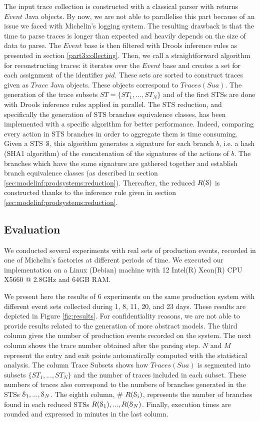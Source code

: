 The input trace collection is constructed with a classical parser
with returns $Event$ Java objects. By now, we are not able to
parallelise this part because of an issue we faced with
Michelin's logging system. The resulting drawback is that the
time to parse traces is longer than expected and heavily depends
on the size of data to parse. The $Event$ base is then filtered
with Drools inference rules as presented in section
\ref{part3:collecting}.  Then, we call a straightforward
algorithm for reconstructing traces: it iterates over the $Event$
base and creates a set for each assignment of the identifier
$pid$. These sets are sorted to construct traces given as $Trace$
Java objects. These objects correspond to $Traces(Sua)$. The
generation of the trace subsets $ST= \{ST_1,...,ST_N\}$ and of
the first STSs are done with Drools inference rules applied
in parallel. The STS reduction, and specifically the generation
of STS branches equivalence classes, has been implemented with a
specific algorithm for better performance. Indeed, comparing
every action in STS branches in order to aggregate them is time
consuming.  Given a STS $\EuScript{S}$, this algorithm generates
a signature for each branch $b$, i.e. a hash (SHA1 algorithm) of
the concatenation of the signatures of the actions of $b$. The
branches which have the same signature are gathered together and
establish branch equivalence classes (as described in section
\ref{sec:modelinf:prodsystems:reduction}). Thereafter, the
reduced $R(\EuScript{S})$ is constructed thanks to the inference
rule given in section \ref{sec:modelinf:prodsystems:reduction}.

\subsection{Evaluation}

We conducted several experiments with real sets of production
events, recorded in one of Michelin's factories at different
periods of time. We executed our implementation on a Linux
(Debian) machine with 12 Intel(R) Xeon(R) CPU X5660 @ 2.8GHz and
64GB RAM.

We present here the results of 6 experiments on the same
production system with different event sets collected during 1,
8, 11, 20, and 23 days. These results are depicted in Figure
\ref{fig:results}. For confidentiality reasons, we are not able
to provide results related to the generation of more abstract
models. The third column gives the number of production events
recorded on the system. The next column shows the trace number
obtained after the parsing step.  $N$ and $M$ represent the entry
and exit points automatically computed with the statistical
analysis. The column Trace Subsets shows how $Traces(Sua)$ is
segmented into subsets $\{ST_1,...,ST_N\}$ and the number of
traces included in each subset. These numbers of traces also
correspond to the numbers of branches generated in the STSs
$\EuScript{S}_1,...,\EuScript{S}_N$. The eighth column, \#
$R(\EuScript{S}_i)$, represents the number of branches found in
each reduced STSs $R(\EuScript{S}_1),...,R(\EuScript{S}_N)$.
Finally, execution times are rounded and expressed in minutes in
the last column.

